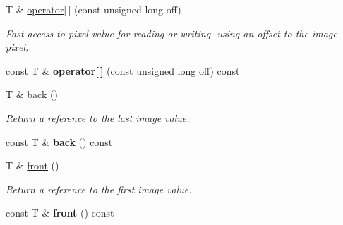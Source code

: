 \begin{DoxyCompactItemize}
\item 
T \& \hyperlink{structcimg__library_1_1_c_img_a53ee85b82244ff16acd428e5ad655540}{operator\mbox{[}$\,$\mbox{]}} (const unsigned long off)
\begin{DoxyCompactList}\small\item\em Fast access to pixel value for reading or writing, using an offset to the image pixel. \item\end{DoxyCompactList}\item 
\hypertarget{structcimg__library_1_1_c_img_a836f6f9d882f3263ba512a722cb39f4a}{
const T \& {\bfseries operator\mbox{[}$\,$\mbox{]}} (const unsigned long off) const }
\label{structcimg__library_1_1_c_img_a836f6f9d882f3263ba512a722cb39f4a}

\item 
\hypertarget{structcimg__library_1_1_c_img_a9fe3b98715c7e946498a301a273fa25b}{
T \& \hyperlink{structcimg__library_1_1_c_img_a9fe3b98715c7e946498a301a273fa25b}{back} ()}
\label{structcimg__library_1_1_c_img_a9fe3b98715c7e946498a301a273fa25b}

\begin{DoxyCompactList}\small\item\em Return a reference to the last image value. \item\end{DoxyCompactList}\item 
\hypertarget{structcimg__library_1_1_c_img_a921255b74ea293d61b022dca4143d105}{
const T \& {\bfseries back} () const }
\label{structcimg__library_1_1_c_img_a921255b74ea293d61b022dca4143d105}

\item 
\hypertarget{structcimg__library_1_1_c_img_a8b0a55d72dc695fe935d6a900e469364}{
T \& \hyperlink{structcimg__library_1_1_c_img_a8b0a55d72dc695fe935d6a900e469364}{front} ()}
\label{structcimg__library_1_1_c_img_a8b0a55d72dc695fe935d6a900e469364}

\begin{DoxyCompactList}\small\item\em Return a reference to the first image value. \item\end{DoxyCompactList}\item 
\hypertarget{structcimg__library_1_1_c_img_a5da999a2ec95ab6f967ec61d0310f5dd}{
const T \& {\bfseries front} () const }
\label{structcimg__library_1_1_c_img_a5da999a2ec95ab6f967ec61d0310f5dd}


\end{DoxyCompactItemize}
